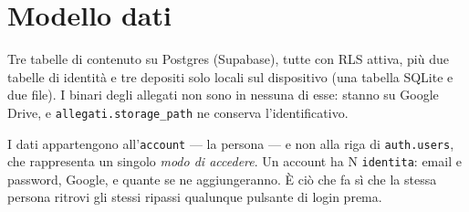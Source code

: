 \documentclass[11pt,a4paper]{report}
\begin{document}
\chapter{Modello dati}

Tre tabelle di contenuto su Postgres (Supabase), tutte con RLS attiva, pi\`u
due tabelle di identit\`a e tre depositi solo locali sul dispositivo (una
tabella SQLite e due file). I binari degli allegati non sono in nessuna di
esse: stanno su Google Drive, e \texttt{allegati.storage\_path} ne conserva
l'identificativo.

I dati appartengono all'\texttt{account} — la persona — e non alla riga di
\texttt{auth.users}, che rappresenta un singolo \emph{modo di accedere}. Un
account ha N \texttt{identita}: email e password, Google, e quante se ne
aggiungeranno. \`E ci\`o che fa s\`i che la stessa persona ritrovi gli stessi
ripassi qualunque pulsante di login prema.
\end{document}

